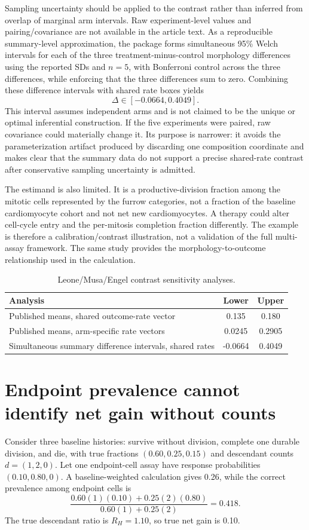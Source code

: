 \documentclass[11pt]{article}
\begin{document}
Sampling uncertainty should be applied to the contrast rather than inferred from overlap of marginal arm intervals. Raw experiment-level values and pairing/covariance are not available in the article text. As a reproducible summary-level approximation, the package forms simultaneous 95\% Welch intervals for each of the three treatment-minus-control morphology differences using the reported SDs and $n=5$, with Bonferroni control across the three differences, while enforcing that the three differences sum to zero. Combining these difference intervals with shared rate boxes yields
\begin{equation}
\Delta\in[-0.0664,0.4049].
\end{equation}
This interval assumes independent arms and is not claimed to be the unique or optimal inferential construction. If the five experiments were paired, raw covariance could materially change it. Its purpose is narrower: it avoids the parameterization artifact produced by discarding one composition coordinate and makes clear that the summary data do not support a precise shared-rate contrast after conservative sampling uncertainty is admitted.

The estimand is also limited. It is a productive-division fraction among the mitotic cells represented by the furrow categories, not a fraction of the baseline cardiomyocyte cohort and not net new cardiomyocytes. A therapy could alter cell-cycle entry and the per-mitosis completion fraction differently. The example is therefore a calibration/contrast illustration, not a validation of the full multi-assay framework. The same study provides the morphology-to-outcome relationship used in the calculation.

\begin{table}[ht]
\centering
\caption{Leone/Musa/Engel contrast sensitivity analyses.}
\begin{tabular}{p{}cc}
\toprule
Analysis & Lower & Upper\\
\midrule
Published means, shared outcome-rate vector & 0.135 & 0.180\\
Published means, arm-specific rate vectors & 0.0245 & 0.2905\\
Simultaneous summary difference intervals, shared rates & -0.0664 & 0.4049\\
\bottomrule
\end{tabular}
\end{table}

\section{Endpoint prevalence cannot identify net gain without counts}
Consider three baseline histories: survive without division, complete one durable division, and die, with true fractions $(0.60,0.25,0.15)$ and descendant counts $d=(1,2,0)$. Let one endpoint-cell assay have response probabilities $(0.10,0.80,0)$. A baseline-weighted calculation gives 0.26, while the correct prevalence among endpoint cells is
\begin{equation}
\frac{0.60(1)(0.10)+0.25(2)(0.80)}{0.60(1)+0.25(2)}=0.418.
\end{equation}
The true descendant ratio is $R_H=1.10$, so true net gain is 0.10.
\end{document}
